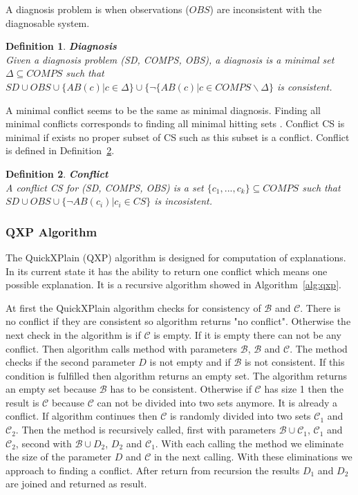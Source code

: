 \documentclass[12pt,a4paper]{article}
\newtheorem{definition}{Definition}[subsection]
\begin{document}
A diagnosis problem is when observations ($OBS$) are inconsistent with the diagnosable system.

\begin{definition}{\textbf{Diagnosis}} \\
	\label{def:diagnosis}
	\noindent Given a diagnosis problem (SD, COMPS, OBS), a diagnosis is a minimal set $\Delta \subseteq COMPS$ such that $SD \cup OBS \cup \{ AB(c) | c \in \Delta \} \cup \{ \neg \{AB(c) | c \in COMPS \backslash \Delta \}$ is consistent.
\end{definition}

A minimal conflict seems to be the same as minimal diagnosis. Finding all minimal conflicts corresponds to finding all minimal hitting sets \citep{reiterHS}. Conflict CS is minimal if exists no proper subset of CS such as this subset is a conflict. Conflict is defined in Definition~\ref{def:conflict}.

\begin{definition}{\textbf{Conflict}} \\
	\label{def:conflict}
	\noindent A conflict CS for (SD, COMPS, OBS) is a set $\{c_{1}, ..., c_{k}\} \subseteq COMPS$ such that $SD \cup OBS \cup \{ \neg AB(c_{i}) | c_{i} \in CS \} $ is incosistent.
\end{definition}

\subsubsection{QXP Algorithm}

The QuickXPlain (QXP) algorithm is designed for computation of explanations. In its current state it has the ability to return one conflict which means one possible explanation. It is a recursive algorithm showed in Algorithm~\ref{alg:qxp}.

At first the QuickXPlain algorithm checks for consistency of $\mathcal{B}$ and $\mathcal{C}$. There is no conflict if they are consistent so algorithm returns "no conflict". Otherwise the next check in the algorithm is if $\mathcal{C}$ is empty. If it is empty there can not be any conflict. Then algorithm calls method  with parameters $\mathcal{B}$, $\mathcal{B}$ and $\mathcal{C}$. The  method checks if the second parameter $D$ is not empty and if $\mathcal{B}$ is not consistent. If this condition is fulfilled then algorithm returns an empty set. The algorithm returns an empty set because $\mathcal{B}$ has to be consistent. Otherwise if $\mathcal{C}$ has size 1 then the result is $\mathcal{C}$ because $\mathcal{C}$ can not be divided into two sets anymore. It is already a conflict. If algorithm continues then $\mathcal{C}$ is randomly divided into two sets $\mathcal{C}_{1}$ and $\mathcal{C}_{2}$. Then the method  is recursively called, first with parameters $\mathcal{B} \cup \mathcal{C}_{1}$, $\mathcal{C}_{1}$ and $\mathcal{C}_{2}$, second with $\mathcal{B} \cup D_{2}$, $D_{2}$ and $\mathcal{C}_{1}$. With each calling the  method we eliminate the size of the parameter $D$ and $\mathcal{C}$ in the next calling. With these eliminations we approach to finding a conflict. After return from recursion the results $D_{1}$ and $D_{2}$ are joined and returned as result.
\end{document}
